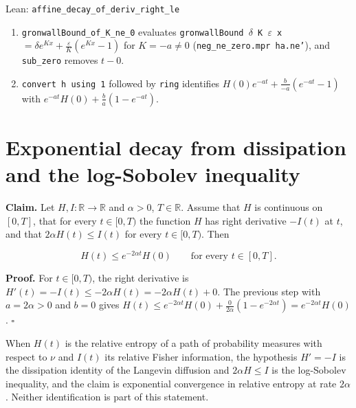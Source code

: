 \documentclass[11pt,a4paper]{article}
\begin{document}
\begin{leanbox}{Lean: \texttt{affine\_\allowbreak{}decay\_\allowbreak{}of\_\allowbreak{}deriv\_\allowbreak{}right\_\allowbreak{}le}}
\begin{enumerate}
\item \texttt{gronwall\allowbreak{}Bound\_\allowbreak{}of\_\allowbreak{}K\_\allowbreak{}ne\_\allowbreak{}0} evaluates \texttt{gronwall\allowbreak{}Bound \ensuremath{\delta} K \ensuremath{\varepsilon} x} \(=\delta e^{Kx}+\frac{\varepsilon}{K}(e^{Kx}-1)\) for \(K=-a\neq0\) (\texttt{neg\_\allowbreak{}ne\_\allowbreak{}zero.\allowbreak{}mpr ha.\allowbreak{}ne'}), and \texttt{sub\_\allowbreak{}zero} removes \(t-0\).

\item \texttt{convert h using 1} followed by \texttt{ring} identifies \(H(0)e^{-at}+\frac{b}{-a}(e^{-at}-1)\) with \(e^{-at}H(0)+\frac ba(1-e^{-at})\).

\end{enumerate}
\end{leanbox}

\section{\texorpdfstring{Exponential decay from dissipation and the log-Sobolev inequality}{Exponential decay from dissipation and the log-Sobolev inequality}}


\textbf{Claim.} Let \(H,I:\mathbb R\to\mathbb R\) and \(\alpha>0\), \(T\in\mathbb R\). Assume that \(H\) is continuous on \([0,T]\), that for every \(t\in[0,T)\) the function \(H\) has right derivative \(-I(t)\) at \(t\), and that \(2\alpha H(t)\le I(t)\) for every \(t\in[0,T)\). Then


\[H(t)\le e^{-2\alpha t}H(0)\qquad\text{for every }t\in[0,T].\]


\textbf{Proof.} For \(t\in[0,T)\), the right derivative is \(H'(t)=-I(t)\le-2\alpha H(t)=-2\alpha H(t)+0\). The previous step with \(a=2\alpha>0\) and \(b=0\) gives \(H(t)\le e^{-2\alpha t}H(0)+\frac0{2\alpha}(1-e^{-2\alpha t})=e^{-2\alpha t}H(0)\). \(\square\)




When \(H(t)\) is the relative entropy of a path of probability measures with respect to \(\nu\) and \(I(t)\) its relative Fisher information, the hypothesis \(H'=-I\) is the dissipation identity of the Langevin diffusion and \(2\alpha H\le I\) is the log-Sobolev inequality, and the claim is exponential convergence in relative entropy at rate \(2\alpha\). Neither identification is part of this statement.
\end{document}
